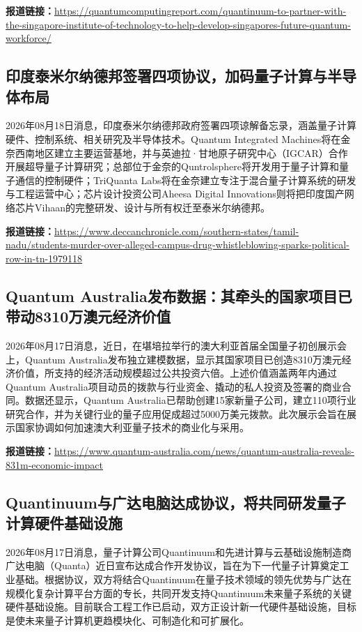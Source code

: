 \documentclass[12pt,a4paper]{ctexart}
\begin{document}
\noindent\textbf{报道链接：}\url{https://quantumcomputingreport.com/quantinuum-to-partner-with-the-singapore-institute-of-technology-to-help-develop-singapores-future-quantum-workforce/}

\subsection{ 印度泰米尔纳德邦签署四项协议，加码量子计算与半导体布局 }

2026年08月18日消息，印度泰米尔纳德邦政府签署四项谅解备忘录，涵盖量子计算硬件、控制系统、相关研究及半导体技术。Quantum Integrated Machines将在金奈西南地区建立主要运营基地，并与英迪拉·甘地原子研究中心（IGCAR）合作开展超导量子计算研究；总部位于金奈的Quntrolsphere将开发用于量子计算和量子通信的控制硬件；TriQuanta Labs将在金奈建立专注于混合量子计算系统的研发与工程运营中心；芯片设计投资公司Aheesa Digital Innovations则将把印度国产网络芯片Vihaan的完整研发、设计与所有权迁至泰米尔纳德邦。

\noindent\textbf{报道链接：}\url{https://www.deccanchronicle.com/southern-states/tamil-nadu/students-murder-over-alleged-campus-drug-whistleblowing-sparks-political-row-in-tn-1979118}

\subsection{ Quantum Australia发布数据：其牵头的国家项目已带动8310万澳元经济价值 }

2026年08月17日消息，近日，在堪培拉举行的澳大利亚首届全国量子初创展示会上，Quantum Australia发布独立建模数据，显示其国家项目已创造8310万澳元经济价值，所支持的经济活动规模超过公共投资六倍。上述价值涵盖两年内通过Quantum Australia项目动员的拨款与行业资金、撬动的私人投资及签署的商业合同。数据还显示，Quantum Australia已帮助创建15家新量子公司，建立110项行业研究合作，并为关键行业的量子应用促成超过5000万美元拨款。此次展示会旨在展示国家协调如何加速澳大利亚量子技术的商业化与采用。

\noindent\textbf{报道链接：}\url{https://www.quantum-australia.com/news/quantum-australia-reveals-831m-economic-impact}

\subsection{ Quantinuum与广达电脑达成协议，将共同研发量子计算硬件基础设施 }

2026年08月17日消息，量子计算公司Quantinuum和先进计算与云基础设施制造商广达电脑（Quanta）近日宣布达成合作开发协议，旨在为下一代量子计算奠定工业基础。根据协议，双方将结合Quantinuum在量子技术领域的领先优势与广达在规模化复杂计算平台方面的专长，共同开发支持Quantinuum未来量子系统的关键硬件基础设施。目前联合工程工作已启动，双方正设计新一代硬件基础设施，目标是使未来量子计算机更趋模块化、可制造化和可扩展化。
\end{document}
